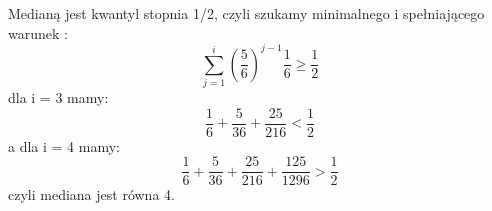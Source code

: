 Medianą jest kwantyl stopnia 1/2, czyli szukamy minimalnego i spełniającego warunek :
$$
 \sum_{j=1}^{i} \left( \frac{5}{6}\right)^{j-1}\frac{1}{6} \ge \frac{1}{2}
$$
dla i = 3 mamy: 
$$
\frac{1}{6} + \frac{5}{36} + \frac{25}{216} < \frac{1}{2}
$$
a dla i = 4 mamy: 
$$
\frac{1}{6} + \frac{5}{36} + \frac{25}{216} + \frac{125}{1296} > \frac{1}{2}
$$
czyli mediana jest równa 4.
